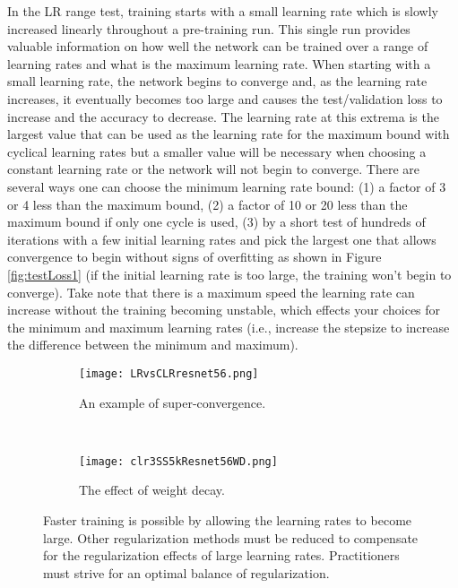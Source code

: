 \documentclass{article} %
\begin{document}
In the LR range test, training starts with a small learning rate which is slowly increased linearly throughout a  pre-training run.  This single run provides valuable information on how well the network can be trained over a range of learning rates and what is the maximum learning rate.   When starting with a small learning rate, the network begins to converge and, as the learning rate increases, it eventually becomes too large and causes the test/validation loss to increase and the accuracy to decrease. The learning rate at this extrema is the largest value that can be used as the  learning rate for the maximum bound with cyclical learning rates but a smaller value will be necessary when choosing a constant learning rate or the network will not begin to converge.  There are several ways one can choose the minimum learning rate bound: (1) a factor of 3 or 4 less than the maximum bound, (2) a factor of 10 or 20 less than the maximum bound if only one cycle is used, (3)  by a short test of hundreds of iterations with a few initial learning rates and pick the largest one that allows convergence to begin without signs of overfitting as shown in Figure \ref{fig:testLoss1} (if the initial learning rate is too large, the training won't begin to converge).  Take note that there is a maximum speed the learning rate can increase without the training becoming unstable, which effects your choices for the minimum and maximum learning rates (i.e., increase the stepsize to increase the difference between the minimum and maximum).

\begin{figure}[tbh]
	\centering
	\begin{subfigure}[b]{0.42\textwidth}
		\texttt{[image: LRvsCLRresnet56.png]}
		\caption{An example of super-convergence.}
		\label{fig:LRvsCLRresnet56}       %
	\end{subfigure}
	\quad
	\hfill
	~ %
	\centering
	\begin{subfigure}[b]{0.52\textwidth}
		\texttt{[image: clr3SS5kResnet56WD.png]}
		\caption{The effect of weight decay.}
		\label{fig:clr3SS5kResnet56WD}       %
	\end{subfigure}
	\caption{Faster training is possible by allowing the learning rates to become large.  Other regularization methods must be reduced to compensate for the regularization effects of large learning rates. Practitioners must strive for an optimal balance of regularization.}
	\label{fig:superConvergence}
	\vspace{-5pt}	
\end{figure}
\end{document}
